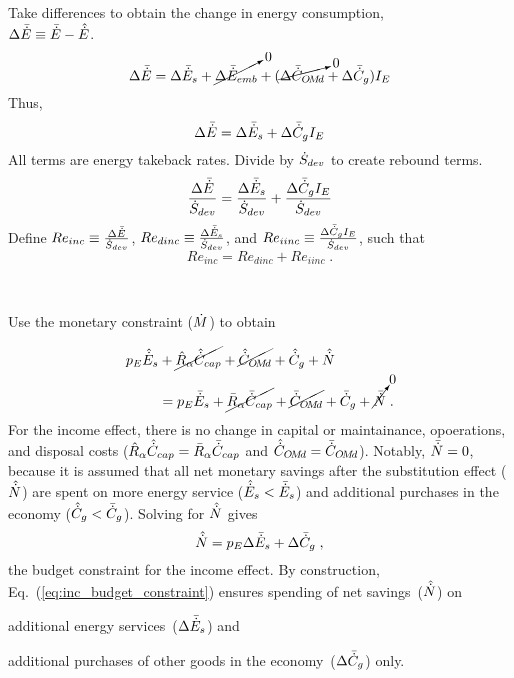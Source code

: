 \begin{landscape}
{Take differences to obtain the change in energy consumption, \\
$\Delta \bar{\dot{E}} \equiv \bar{\dot{E}} - \hat{\dot{E}}$.
%
\begin{equation}
  \Delta \bar{\dot{E}} = \Delta \bar{\dot{E}}_s 
                     + \cancelto{0}{\Delta \bar{\dot{E}}_{emb}}
                     + (\cancelto{0}{\Delta \bar{\dot{C}}_{O\!M\!d}} + \Delta \bar{\dot{C}}_g) I_E
\end{equation}
%
Thus, 
%
\begin{equation}
  \Delta \bar{\dot{E}} = \Delta \bar{\dot{E}}_s + \Delta \bar{\dot{C}}_g I_E
\end{equation}
%
All terms are energy takeback rates.
Divide by $\dot{S}_{dev}$
to create rebound terms.
%
\begin{equation}
  \frac{\Delta \bar{\dot{E}}}{\dot{S}_{dev}} = \frac{\Delta \bar{\dot{E}}_s}{\dot{S}_{dev}} + \frac{\Delta \bar{\dot{C}}_g I_E}{\dot{S}_{dev}}
\end{equation}
%
Define 
$Re_{inc} \equiv \frac{\Delta \bar{\dot{E}}}{\dot{S}_{dev}}$, 
$Re_{dinc} \equiv \frac{\Delta \bar{\dot{E}}_s}{\dot{S}_{dev}}$, and 
$Re_{iinc} \equiv \frac{\Delta \bar{\dot{C}}_g I_E}{\dot{S}_{dev}}$,
such that
%
\begin{equation} \label{eq:Re_inc_def}
  Re_{inc} = Re_{dinc} + Re_{iinc} \; .
\end{equation}
%
}
{
~

Use the monetary constraint ($\dot{M}$) to obtain

\begin{align}
  p_E \hat{\dot{E}}_s &+ \cancel{\hat{R}_\alpha \hat{\dot{C}}_{cap}} + \cancel{\hat{\dot{C}}_{O\!M\!d}} + \hat{\dot{C}}_g + \hat{\dot{N}} \nonumber \\
                  &= p_E \bar{\dot{E}}_s + \cancel{\bar{R}_\alpha \bar{\dot{C}}_{cap}} + \cancel{\bar{\dot{C}}_{O\!M\!d}} + \bar{\dot{C}}_g + \cancelto{0}{\bar{\dot{N}}} \; .
\end{align}
%
For the income effect, there is no change in capital or maintainance, opoerations, and disposal costs
($\hat{R}_\alpha \hat{\dot{C}}_{cap} = \bar{R}_\alpha \bar{\dot{C}}_{cap}$ and
$\hat{\dot{C}}_{O\!M\!d} = \bar{\dot{C}}_{O\!M\!d}$).
Notably, $\bar{\dot{N}} = 0$,
because it is assumed that all net monetary savings 
after the substitution effect ($\hat{\dot{N}}$) are spent on
more energy service ($\hat{\dot{E}}_s < \bar{\dot{E}}_s$)
and
additional purchases in the economy ($\hat{\dot{C}}_g < \bar{\dot{C}}_g$).
Solving for $\hat{\dot{N}}$ gives 
%
\begin{equation} \label{eq:inc_budget_constraint}
  \hat{\dot{N}} = p_E \Delta \bar{\dot{E}}_s + \Delta \bar{\dot{C}}_g \; ,
\end{equation}
%
the budget constraint for the income effect.
By construction, 
Eq.~(\ref{eq:inc_budget_constraint}) ensures
spending of net savings~($\hat{\dot{N}}$) on
%
\begin{enumerate*}[label={(\roman*)}]
	
  \item additional energy services~($\Delta \bar{\dot{E}}_s$) and
  
  \item additional purchases of other goods in the economy~($\Delta \bar{\dot{C}}_g$) only.
    
\end{enumerate*}
}
\end{landscape}
